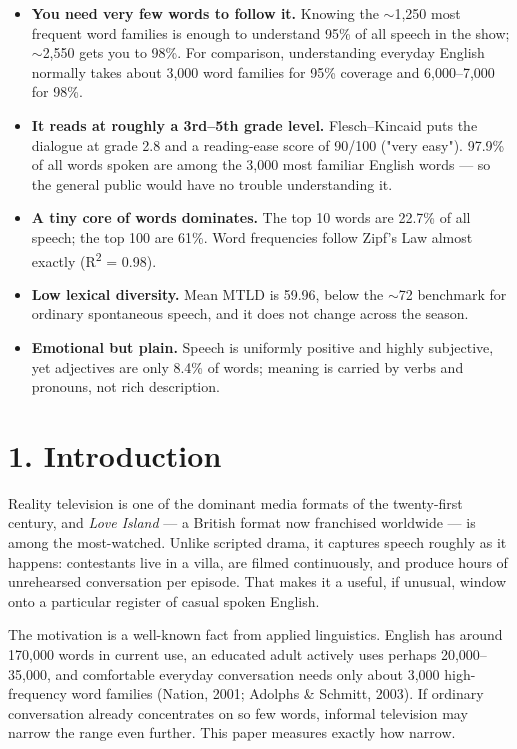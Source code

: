 \documentclass[11pt]{article}
\begin{document}
\begin{itemize}
\item \textbf{You need very few words to follow it.} Knowing the $\sim$1,250 most frequent word families is enough to understand 95\% of all speech in the show; $\sim$2,550 gets you to 98\%. For comparison, understanding everyday English normally takes about 3,000 word families for 95\% coverage and 6,000--7,000 for 98\%.
\item \textbf{It reads at roughly a 3rd--5th grade level.} Flesch--Kincaid puts the dialogue at grade 2.8 and a reading-ease score of 90/100 ("very easy"). 97.9\% of all words spoken are among the 3,000 most familiar English words --- so the general public would have no trouble understanding it.
\item \textbf{A tiny core of words dominates.} The top 10 words are 22.7\% of all speech; the top 100 are 61\%. Word frequencies follow Zipf's Law almost exactly (R\textsuperscript{2} = 0.98).
\item \textbf{Low lexical diversity.} Mean MTLD is 59.96, below the $\sim$72 benchmark for ordinary spontaneous speech, and it does not change across the season.
\item \textbf{Emotional but plain.} Speech is uniformly positive and highly subjective, yet adjectives are only 8.4\% of words; meaning is carried by verbs and pronouns, not rich description.
\end{itemize}


\section*{1. Introduction}

Reality television is one of the dominant media formats of the twenty-first century, and \emph{Love Island} --- a British format now franchised worldwide --- is among the most-watched. Unlike scripted drama, it captures speech roughly as it happens: contestants live in a villa, are filmed continuously, and produce hours of unrehearsed conversation per episode. That makes it a useful, if unusual, window onto a particular register of casual spoken English.

The motivation is a well-known fact from applied linguistics. English has around 170,000 words in current use, an educated adult actively uses perhaps 20,000--35,000, and comfortable everyday conversation needs only about 3,000 high-frequency word families (Nation, 2001; Adolphs \& Schmitt, 2003). If ordinary conversation already concentrates on so few words, informal television may narrow the range even further. This paper measures exactly how narrow.
\end{document}
